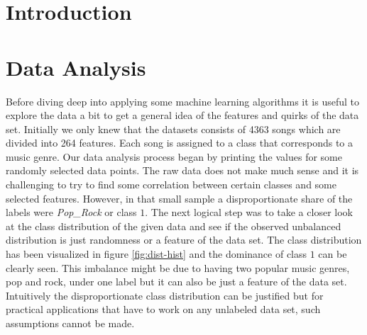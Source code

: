 \documentclass[fleqn,10pt]{SelfArx} %
\affiliation{\textsuperscript{1}\textit{}} %
\affiliation{\textsuperscript{2}\textit{}} %
\begin{document}
\boldmath

\flushbottom %

\maketitle %
\tableofcontents %
\thispagestyle{empty} %


\section{Introduction} %


\lipsum[1-3] %


\section{Data Analysis}

Before diving deep into applying some machine learning algorithms it is useful
to explore the data a bit to get a general idea of the features and quirks of
the data set. Initially we only knew that the datasets consists of 4363 songs
which are divided into 264 features. Each song is assigned to a class that
corresponds to a music genre. Our data analysis process began by printing the
values for some randomly selected data points. The raw data does not make much
sense and it is challenging to try to find some correlation between certain
classes and some selected features. However, in that small sample a
disproportionate share of the labels were \textit{Pop\_Rock} or class $1$. The
next logical step was to take a closer look at the class distribution of the
given data and see if the observed unbalanced distribution is just randomness or
a feature of the data set. The class distribution has been visualized in figure
\ref{fig:dist-hist} and the dominance of class $1$ can be clearly seen. This
imbalance might be due to having two popular music genres, pop and rock, under
one label but it can also be just a feature of the data set. Intuitively the
disproportionate class distribution can be justified but for practical
applications that have to work on any unlabeled data set, such assumptions
cannot be made.
\end{document}
